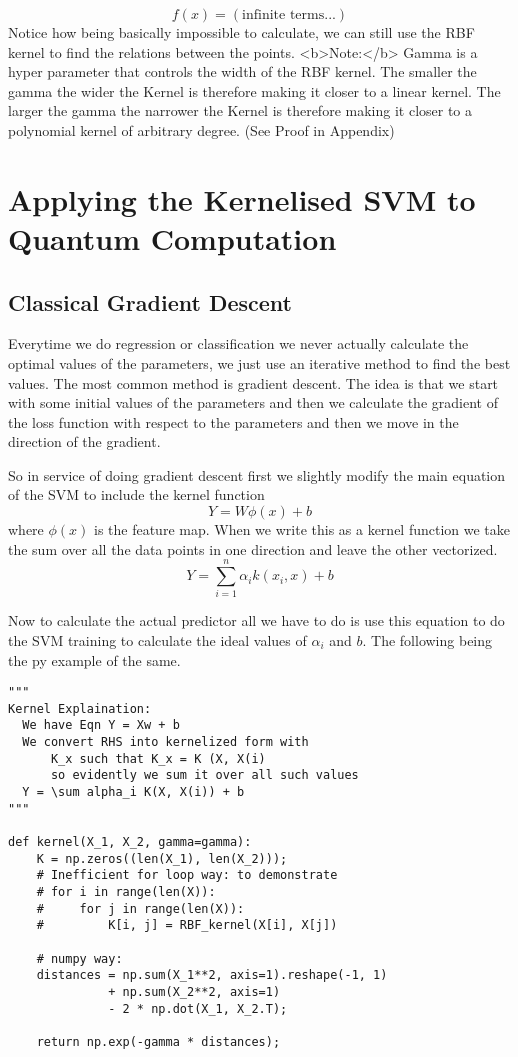 \documentclass[hidelinks]{book}
\numberwithin{equation}{section}
\begin{document}
$$ f(x) = (\text{infinite terms...}) $$ Notice how being basically
impossible to calculate, we can still use the RBF kernel to find the
relations between the points.
<b>Note:</b> Gamma is a hyper parameter that controls the width of the RBF kernel.
The smaller the gamma the wider the Kernel is therefore making it closer to a
linear kernel. The larger the gamma the narrower the Kernel is therefore making
it closer to a polynomial kernel of arbitrary degree. (See Proof in Appendix)

\section{Applying the Kernelised SVM to Quantum Computation}
\subsection{Classical Gradient Descent}
Everytime we do regression or classification we never actually calculate the
optimal values of the parameters, we just use an iterative method to find
the best values. The most common method is gradient descent. The idea is
that we start with some initial values of the parameters and then we
calculate the gradient of the loss function with respect to the parameters
and then we move in the direction of the gradient.

So in service of doing gradient descent first we slightly modify the
main equation of the SVM to include the kernel function
$$ Y = W\phi(x) +b $$ where $\phi(x)$ is the feature map. When we write this
as a kernel function we take the sum over all the data points in one direction
and leave the other vectorized.
$$ Y = \sum_{i=1}^n \alpha_i k(x_i, x) + b $$

Now to calculate the actual predictor all we have to do is use this equation
to do the SVM training to calculate the ideal values of $\alpha_i$ and $b$.
The following being the py example of the same.
\begin{verbatim}
"""
Kernel Explaination:
  We have Eqn Y = Xw + b
  We convert RHS into kernelized form with
      K_x such that K_x = K (X, X(i)
      so evidently we sum it over all such values
  Y = \sum alpha_i K(X, X(i)) + b
"""

def kernel(X_1, X_2, gamma=gamma):
    K = np.zeros((len(X_1), len(X_2)));
    # Inefficient for loop way: to demonstrate
    # for i in range(len(X)):
    #     for j in range(len(X)):
    #         K[i, j] = RBF_kernel(X[i], X[j])

    # numpy way:
    distances = np.sum(X_1**2, axis=1).reshape(-1, 1)
              + np.sum(X_2**2, axis=1)
              - 2 * np.dot(X_1, X_2.T);

    return np.exp(-gamma * distances);
\end{verbatim}
\end{document}
